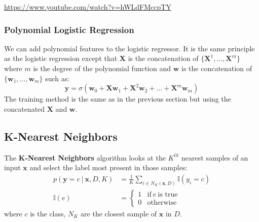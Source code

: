 \documentclass[12pt]{report}
\begin{document}
                \url{https://www.youtube.com/watch?v=hWLdFMccpTY}
                
                \subsubsection{Polynomial Logistic Regression}
                    We can add polynomial features to the logistic regressor.
                    It is the same principle as the logistic regression except that $\boldsymbol{X}$ is the concatenation of $\{\boldsymbol{X}^1, \dots, \boldsymbol{X}^m\}$ where $m$ is the degree of the polynomial function and $\boldsymbol{w}$ is the concatenation of $\{\boldsymbol{w}_1, \dots, \boldsymbol{w}_m\}$ such as:
                    \begin{equation}
                        \boldsymbol{y} = \sigma(\boldsymbol{w}_0 + \boldsymbol{X}\boldsymbol{w}_1 + \boldsymbol{X}^2\boldsymbol{w}_2 + \dots + \boldsymbol{X}^m\boldsymbol{w}_m)
                    \end{equation}
                    The training method is the same as in the previous section but using the concatenated $\boldsymbol{X}$ and $\boldsymbol{w}$. 
            
            \subsection{K-Nearest Neighbors}
        The \textbf{K-Nearest Neighbors} algorithm looks at the $K^{th}$ nearest samples of an input $\mathbf{x}$ and select the label most present in those samples:
        \begin{align}
            p(\mathbf{y} = c~|~\boldsymbol{\mathbf{x}}, D, K) &= \frac{1}{K} \sum_{i \in N_K(\boldsymbol{\mathbf{x}}, D)}\mathbb{I}(y_i = c)\\
            \mathbb{I}(e) &=
            \begin{cases}
                1 & \text{if}~e~\text{is true}\\
                0 & \text{otherwise}
            \end{cases}
        \end{align}
        where $c$ is the class, $N_K$ are the closest sample of $\boldsymbol{\text{x}}$ in $D$.
                    
\end{document}
